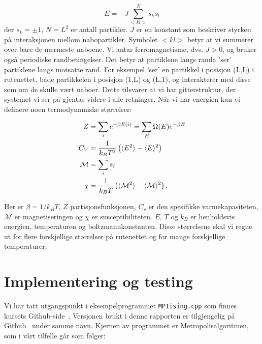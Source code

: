\documentclass[11pt]{article}
\begin{document}
\begin{equation}
  E=-J\sum_{<kl>}^{N}s_ks_l\label{eq:energi}
\end{equation}
der  $s_k=\pm 1$, $N = L^2$ er antall partikler.
$J$ er en konstant som beskriver styrken på interaksjonen mellom
nabopartikler. Symbolet $<kl>$ betyr at vi summerer over bare de
nærmeste naboene. Vi antar ferromagnetisme, dvs.  $J> 0$, og bruker også
periodiske randbetingelser. Det betyr at partiklene langs randa 'ser' 
partiklene langs motsatte rand. For eksempel 'ser' en partikkel i posisjon
(L,L) i rutenettet, både partikkelen i posisjon (1,L) og (L,1), og interakterer
med disse som om de skulle vært naboer. Dette tilsvarer at vi har
gitterstruktur, der systemet vi ser på gjentas videre i alle
retninger. Når vi har energien kan vi definere noen termodynamiske størrelser:

\begin{align}
Z &= \sum_i e^{-\beta E(i)} = \sum_E \Omega(E) e^{-\beta E}\label{eq:partisjons-funk} \\
C_V &= \frac{ 1 }{ k_B T^2} \left( \langle E^2 \rangle-\langle E \rangle^2 \right)\label{eq:spesifikk-varmekapasitet} \\
\mathcal{M} &= \sum_i s_i\label{eq:magnetisering} \\
\chi &= \frac{ 1 }{ k_BT } \left( \langle \mathcal{M}^2 \rangle - \langle \mathcal{M} \rangle^2 \right)\label{eq:susceptibilitet}.
\end{align}

Her er $\beta = 1/k_BT$, $Z$ partisjonsfunksjonen, $C_v$ er den spesifikke varmekapasiteten,
$\mathcal{M}$ er magnetiseringen og $\chi$ er susceptibiliteten. $E$, $T$ og $k_B$ er henholdsvis 
energien, temperaturen og boltzmannkonstanten. Disse størrelsene skal vi regne ut for flere forskjellige
størrelser på rutenettet og for mange forskjellige temperaturer.


\section{Implementering og testing}

Vi har tatt utgangspunkt i eksempelprogrammet \texttt{MPIising.cpp}
som finnes kursets Github-side~\cite{compphys-github}. Versjonen brukt
i denne rapporten er tilgjengelig på Github~\cite{github-repo} under samme navn. Kjernen av
programmet er Metropolisalgoritmen, som i vårt tilfelle går som følger: 
\end{document}
